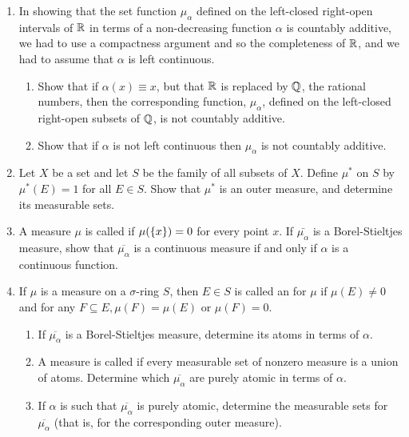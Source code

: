 \begin{enumerate}[label=\arabic*),ref=\arabic*]
\item In showing that the set function $\mu_\alpha$ defined on the left-closed right-open intervals of $\mathbb{R}$ in terms of a non-decreasing function $\alpha$ is countably additive, we had to use a compactness argument and so the completeness of $\mathbb{R}$, and we had to assume that $\alpha$ is left continuous.

\begin{enumerate}
\item Show that if $\alpha(x)\equiv x$, but that $\mathbb{R}$ is replaced by $\mathbb{Q}$, the rational numbers, then the corresponding function, $\mu_\alpha$, defined on the left-closed right-open subsets of $\mathbb{Q}$, is not countably additive.
\item Show that if $\alpha$ is not left continuous then $\mu_\alpha$ is not countably additive.
\end{enumerate}

\item\label{exer:empty meas sets}
Let $X$ be a set and let $S$ be the family of all subsets of $X$. Define $\mu^*$ on $S$ by $\mu^*(E)=1$ for all $E\in S$. Show that $\mu^*$ is an outer measure, and determine its measurable sets.

\item A measure $\mu$ is called  if $\mu(\left\{x\right\})=0$ for every point $x$. If $\bar{\mu_\alpha}$ is a Borel-Stieltjes measure, show that $\overline{\mu_\alpha}$ is a continuous measure if and only if $\alpha$ is a continuous function.

\item If $\mu$ is a measure on a $\sigma$-ring $S$, then $E\in S$ is called an  for $\mu$ if $\mu(E)\neq 0$ and for any $F\subseteq E,\mu(F)=\mu(E)$ or $\mu(F)=0$.
\begin{enumerate}
\item If $\overline{\mu_\alpha}$ is a Borel-Stieltjes measure, determine its atoms in terms of $\alpha$.
\item A measure is called  if every measurable set of nonzero measure is a union of atoms. Determine which $\overline{\mu_\alpha}$ are purely atomic in terms of $\alpha$.
\item If $\alpha$ is such that $\overline{\mu_\alpha}$ is purely atomic, determine the measurable sets for $\overline{\mu_\alpha}$ (that is, for the corresponding outer measure).
\end{enumerate}



\end{enumerate}
